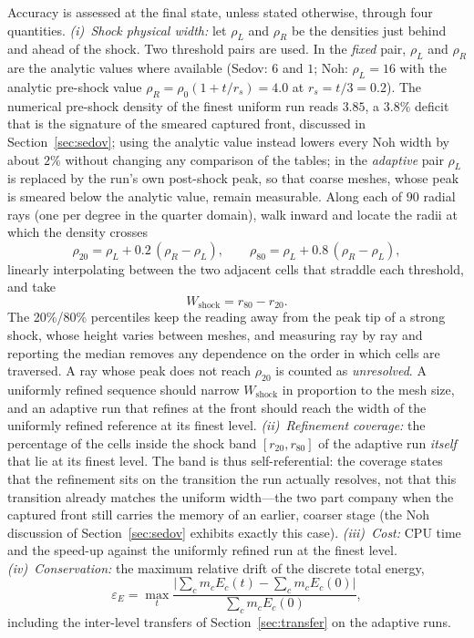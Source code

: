 \documentclass[a4paper]{cas-sc}
\begin{document}
Accuracy is assessed at the final state, unless stated otherwise, through four quantities. \emph{(i)~Shock physical width:} let $\rho_L$ and $\rho_R$ be the densities just behind and ahead of the shock. Two threshold pairs are used. In the \emph{fixed} pair, $\rho_L$ and $\rho_R$ are the analytic values where available (Sedov: $6$ and $1$; Noh: $\rho_L=16$ with the analytic pre-shock value $\rho_R=\rho_0(1+t/r_s)=4.0$ at $r_s=t/3=0.2$). The numerical pre-shock density of the finest uniform run reads $3.85$, a $3.8\%$ deficit that is the signature of the smeared captured front, discussed in Section~\ref{sec:sedov}; using the analytic value instead lowers every Noh width by about $2\%$ without changing any comparison of the tables; in the \emph{adaptive} pair $\rho_L$ is replaced by the run's own post-shock peak, so that coarse meshes, whose peak is smeared below the analytic value, remain measurable. Along each of $90$ radial rays (one per degree in the quarter domain), walk inward and locate the radii at which the density crosses
\begin{equation}
	\rho_{20}=\rho_L+0.2\,(\rho_R-\rho_L),\qquad \rho_{80}=\rho_L+0.8\,(\rho_R-\rho_L),
	\label{eq:wthresh}
\end{equation}
linearly interpolating between the two adjacent cells that straddle each threshold, and take
\begin{equation}
	W_{\mathrm{shock}}=r_{80}-r_{20}.
	\label{eq:wshock}
\end{equation}
The 20\%/80\% percentiles keep the reading away from the peak tip of a strong shock, whose height varies between meshes, and measuring ray by ray and reporting the median removes any dependence on the order in which cells are traversed. A ray whose peak does not reach $\rho_{20}$ is counted as \emph{unresolved}. A uniformly refined sequence should narrow $W_{\mathrm{shock}}$ in proportion to the mesh size, and an adaptive run that refines at the front should reach the width of the uniformly refined reference at its finest level. \emph{(ii)~Refinement coverage:} the percentage of the cells inside the shock band $[r_{20},r_{80}]$ of the adaptive run \emph{itself} that lie at its finest level. The band is thus self-referential: the coverage states that the refinement sits on the transition the run actually resolves, not that this transition already matches the uniform width---the two part company when the captured front still carries the memory of an earlier, coarser stage (the Noh discussion of Section~\ref{sec:sedov} exhibits exactly this case). \emph{(iii)~Cost:} CPU time and the speed-up against the uniformly refined run at the finest level. \emph{(iv)~Conservation:} the maximum relative drift of the discrete total energy,
\begin{equation}
	\varepsilon_E=\max_t\frac{\bigl|\sum_c m_cE_c(t)-\sum_cm_cE_c(0)\bigr|}{\sum_cm_cE_c(0)},
	\label{eq:edrift}
\end{equation}
including the inter-level transfers of Section~\ref{sec:transfer} on the adaptive runs.
\end{document}
